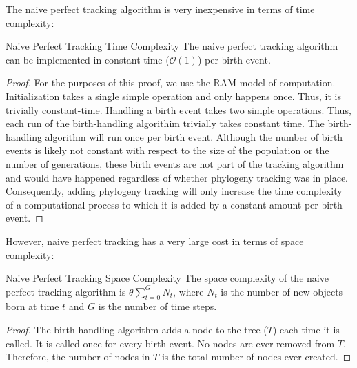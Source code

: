The naive perfect tracking algorithm is very inexpensive in terms of time complexity:

\begin{theorem}{Naive Perfect Tracking Time Complexity}
\label{thm:perfect-tracking-time}
The naive perfect tracking algorithm can be implemented in constant time ($\mathcal{O}(1)$) per birth event.
\end{theorem}

\begin{proof}
\label{prf:perfect-tracking-time}
For the purposes of this proof, we use the RAM model of computation. 
Initialization takes a single simple operation and only happens once. 
Thus, it is trivially constant-time.
Handling a birth event takes two simple operations.
Thus, each run of the birth-handling algorithim trivially takes constant time.
The birth-handling algorithm will run once per birth event.
Although the number of birth events is likely not constant with respect to the size of the population or the number of generations,
these birth events are not part of the tracking algorithm and would have happened regardless of whether phylogeny tracking was in place.
Consequently, adding phylogeny tracking will only increase the time complexity of a computational process to which it is added by a constant amount per birth event.
\end{proof}

However, naive perfect tracking has a very large cost in terms of space complexity:

\begin{theorem}{Naive Perfect Tracking Space Complexity}
\label{thm:perfect-tracking-space}
The space complexity of the naive perfect tracking algorithm is $\mathcal{\theta}\sum_{t=0}^{G} N_t$, where $N_t$ is the number of new objects born at time $t$ and $G$ is the number of time steps.
\end{theorem}

\begin{proof}
\label{prf:perfect-tracking-space}
The birth-handling algorithm adds a node to the tree ($T$) each time it is called.
It is called once for every birth event.
No nodes are ever removed from $T$.
Therefore, the number of nodes in $T$ is the total number of nodes ever created.
\end{proof}
    